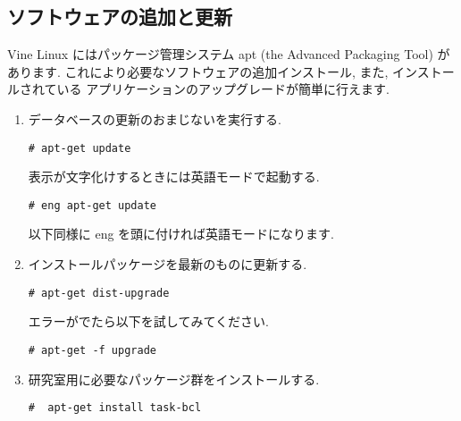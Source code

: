 \documentclass{jarticle}
\begin{document}
\subsection{ソフトウェアの追加と更新}

Vine Linux にはパッケージ管理システム apt (the Advanced Packaging Tool) があります.
これにより必要なソフトウェアの追加インストール, また, インストールされている
アプリケーションのアップグレードが簡単に行えます.
%
%
\begin{enumerate}
	\item データベースの更新のおまじないを実行する.
\begin{verbatim}
# apt-get update
\end{verbatim}
	      表示が文字化けするときには英語モードで起動する.
\begin{verbatim}
# eng apt-get update
\end{verbatim}
	      以下同様に eng を頭に付ければ英語モードになります.

 \item インストールパッケージを最新のものに更新する.
\begin{verbatim}
# apt-get dist-upgrade
\end{verbatim}
       エラーがでたら以下を試してみてください.
\begin{verbatim}
# apt-get -f upgrade
\end{verbatim}
 \item 研究室用に必要なパッケージ群をインストールする.
\begin{verbatim}
#  apt-get install task-bcl
\end{verbatim}

\end{enumerate}
\end{document}
